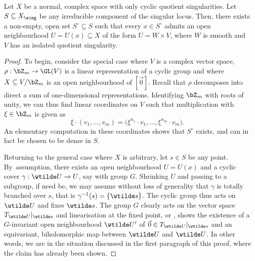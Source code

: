 \begin{lem}\label{lem:glcs}
Let $X$ be a normal, complex space with only cyclic quotient singularities.
Let $S \subseteq X_{\sing}$ be any irreducible component of the singular locus. Then,
there exists a non-empty, open set $S^\circ \subseteq S$ such that every $x \in S^\circ$ admits an
open neighbourhood $U=U(x) \subseteq X$ of the form $U = W \times V$, where $W$ is smooth
and $V$ has an isolated quotient singularity.
\end{lem}
\begin{proof}
To begin, consider the special case where $V$ is a complex vector space,
$\rho : \bZ_m \to \GL(V)$ is a linear representation of a cyclic group and where
$X \subseteq V / \bZ_m$ is an open neighbourhood of $[\vec 0]$. Recall that $\rho$
decomposes into direct a sum of one-dimensional representations. Identifying
$\bZ_m$ with roots of unity, we can thus find linear coordinates on $V$ such
that multiplication with $\xi \in \bZ_m$ is given as
\[
\xi\cdot (v_1, \dots, v_m) = \bigl(\xi^{n_1}\cdot v_1, \dots, \xi^{n_m}\cdot v_m\bigr).
\]
An elementary computation in these coordinates shows that $S^\circ$ exists, and can
in fact be chosen to be dense in $S$.

Returning to the general case where $X$ is arbitrary, let $s \in S$ be any
point. By~assumption, there exists an open neighbourhood $U = U(x)$ and a
cyclic cover $\gamma : \wtilde U \to U$, say with group $G$. Shrinking $U$ and
passing to a subgroup, if need be, we may assume without loss of generality
that $\gamma$ is totally branched over $s$, that is $\gamma^{-1}(s) = \{ \wtilde s \}$.
The cyclic group thus acts on $\wtilde U$ and fixes $\wtilde s$. The group
$G$ clearly acts on the vector space $T_{\wtilde U}|_{\wtilde s}$ and
linearisation at the fixed point, \cite[Proof of Th.\,4]{MR0084174} or
\cite[Cor.\,2 on p.\,13]{MR782881}, shows the existence of a $G$-invariant open
neighbourhood $\wtilde U'$ of $\vec 0 \in T_{\wtilde U}|_{\wtilde s}$ and an
equivariant, biholomorphic map between $\wtilde U$ and $\wtilde U$. In other
words, we are in the situation discussed in the first paragraph of this proof,
where the claim has already been shown.
\end{proof}

